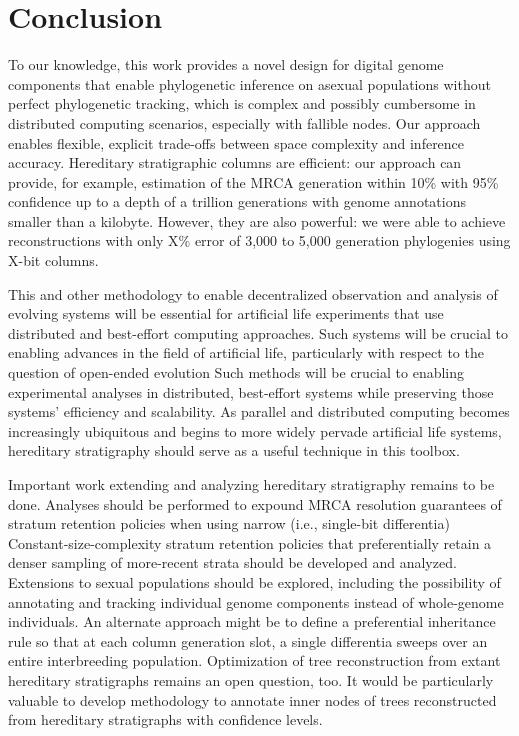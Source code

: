 \section{Conclusion} \label{sec:conclusion}

To our knowledge, this work provides a novel design for digital genome components that enable phylogenetic inference on asexual populations without perfect phylogenetic tracking, which is complex and possibly cumbersome in distributed computing scenarios, especially with fallible nodes.
Our approach enables flexible, explicit trade-offs between space complexity and inference accuracy.
Hereditary stratigraphic columns are efficient: our approach can provide, for example, estimation of the MRCA generation within 10\% with 95\% confidence up to a depth of a trillion generations with genome annotations smaller than a kilobyte.
However, they are also powerful: we were able to achieve reconstructions with only X\% error of 3,000 to 5,000 generation phylogenies using X-bit columns.

This and other methodology to enable decentralized observation and analysis of evolving systems will be essential for artificial life experiments that use distributed and best-effort computing approaches.
Such systems will be crucial to enabling advances in the field of artificial life, particularly with respect to the question of open-ended evolution \citep{ackley2011pursue,moreno2021conduit,moreno2021case}
Such methods will be crucial to enabling experimental analyses in distributed, best-effort systems while preserving those systems' efficiency and scalability.
As parallel and distributed computing becomes increasingly ubiquitous and begins to more widely pervade artificial life systems, hereditary stratigraphy should serve as a useful technique in this toolbox.

Important work extending and analyzing hereditary stratigraphy remains to be done.
Analyses should be performed to expound MRCA resolution guarantees of stratum retention policies when using narrow (i.e., single-bit differentia)
Constant-size-complexity stratum retention policies that preferentially retain a denser sampling of more-recent strata should be developed and analyzed.
Extensions to sexual populations should be explored, including the possibility of annotating and tracking individual genome components instead of whole-genome individuals.
An alternate approach might be to define a preferential inheritance rule so that at each column generation slot, a single differentia sweeps over an entire interbreeding population.
Optimization of tree reconstruction from extant hereditary stratigraphs remains an open question, too.
It would be particularly valuable to develop methodology to annotate inner nodes of trees reconstructed from hereditary stratigraphs with confidence levels.

